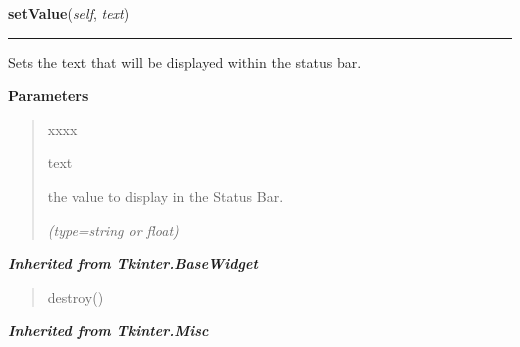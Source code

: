 \hspace{.8\funcindent}\begin{boxedminipage}{\funcwidth}

    \raggedright \textbf{setValue}(\textit{self}, \textit{text})

    \vspace{-1.5ex}

    \rule{\textwidth}{0.5\fboxrule}
\setlength{\parskip}{2ex}
    Sets the text that will be displayed within the status bar.

\setlength{\parskip}{1ex}
      \textbf{Parameters}
      \vspace{-1ex}

      \begin{quote}
        \begin{Ventry}{xxxx}

          \item[text]

          the value to display in the Status Bar.

            {\it (type=string or float)}

        \end{Ventry}

      \end{quote}

    \end{boxedminipage}


\large{\textbf{\textit{Inherited from Tkinter.BaseWidget}}}

\begin{quote}
destroy()
\end{quote}

\large{\textbf{\textit{Inherited from Tkinter.Misc}}}

